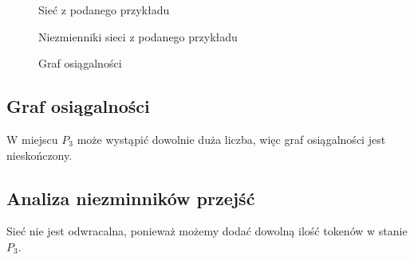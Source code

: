 \begin{figure}[h!]
	\caption{Sieć z podanego przykładu}
	\label{zad2:graph1}
\end{figure}

\begin{figure}[h!]
	\caption{Niezmienniki sieci z podanego przykładu}
	\label{zad2:graph1}
\end{figure}
\begin{figure}[h!]
	\caption{Graf osiągalności}
	\label{zad2:graph1}
\end{figure}
\newpage
\subsection{Graf osiągalności}
W miejscu $P_3$ może wystąpić dowolnie duża liczba, więc graf osiągalności jest nieskończony.
\subsection{Analiza niezminników przejść}
Sieć nie jest odwracalna, ponieważ możemy dodać dowolną ilość tokenów w 
stanie $P_3$.